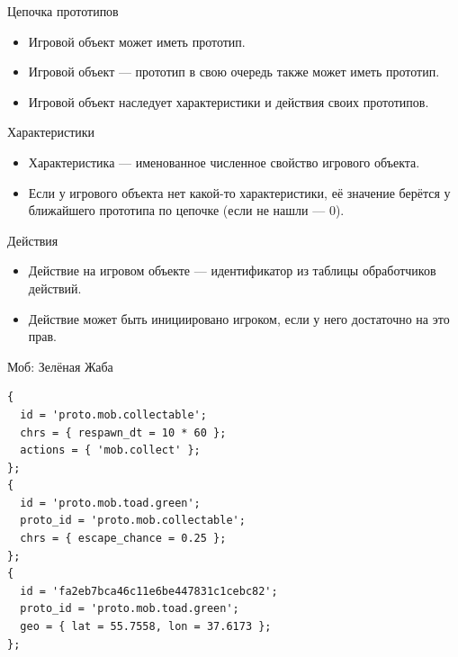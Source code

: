 \documentclass[aspectratio=169,handout,bigger]{beamer}
\begin{document}

\begin{frame}{Цепочка прототипов}
  \begin{itemize}
    \item Игровой объект может иметь прототип.
    \item Игровой объект --- прототип в свою очередь также может иметь прототип.
    \item Игровой объект наследует характеристики и действия своих прототипов.
  \end{itemize}
\end{frame}


\begin{frame}{Характеристики}
  \begin{itemize}
    \item Характеристика --- именованное численное свойство игрового объекта.
    \item Если у игрового объекта нет какой-то характеристики,
          её значение берётся у ближайшего прототипа по цепочке
          (если не нашли --- 0).
  \end{itemize}
\end{frame}


\begin{frame}{Действия}
  \begin{itemize}
    \item Действие на игровом объекте --- идентификатор из таблицы
          обработчиков действий.
    \item Действие может быть инициировано игроком,
          если у него достаточно на это прав.
  \end{itemize}
\end{frame}


\begin{frame}[fragile]{Моб: Зелёная Жаба}
\begin{verbatim}
{
  id = 'proto.mob.collectable';
  chrs = { respawn_dt = 10 * 60 };
  actions = { 'mob.collect' };
};
{
  id = 'proto.mob.toad.green';
  proto_id = 'proto.mob.collectable';
  chrs = { escape_chance = 0.25 };
};
{
  id = 'fa2eb7bca46c11e6be447831c1cebc82';
  proto_id = 'proto.mob.toad.green';
  geo = { lat = 55.7558, lon = 37.6173 };
};
\end{verbatim}
\end{frame}
\end{document}
